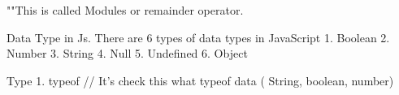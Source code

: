 ""This is called Modules or remainder operator. 

Data Type in Js. There are 6 types of data types in JavaScript
    1. Boolean
    2. Number
    3. String
    4. Null
    5. Undefined
    6. Object

Type 
    1. typeof // It's check this what typeof data ( String, boolean, number)
    
